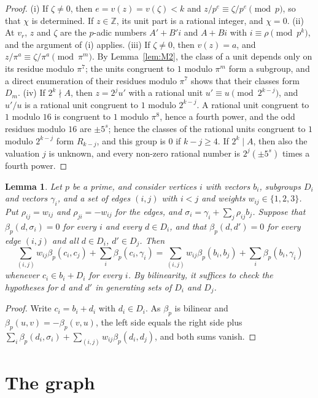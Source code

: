 \documentclass[11pt]{article}
\newtheorem{lemma}[theorem]{Lemma}
\newcommand{\Z}{\mathbb{Z}}
\begin{document}
\begin{proof}
(i) If $\zeta\neq0$, then $e=v(z)=v(\zeta)<k$ and $z/p^e\equiv\zeta/p^e\pmod p$, so that $\chi$ is determined. If $z\in\Z$, its unit part is a rational integer, and $\chi=0$. (ii) At $v_r$, $z$ and $\zeta$ are the $p$-adic numbers $A'+B'i$ and $A+Bi$ with $i\equiv\rho\pmod{p^k}$, and the argument of (i) applies. (iii) If $\zeta\neq0$, then $v(z)=a$, and $z/\pi^a\equiv\zeta/\pi^a\pmod{\pi^m}$. By Lemma~\ref{lem:M2}, the class of a unit depends only on its residue modulo $\pi^7$; the units congruent to $1$ modulo $\pi^m$ form a subgroup, and a direct enumeration of their residues modulo $\pi^7$ shows that their classes form $D_m$. (iv) If $2^k\nmid A$, then $z=2^ju'$ with a rational unit $u'\equiv u\pmod{2^{k-j}}$, and $u'/u$ is a rational unit congruent to $1$ modulo $2^{k-j}$. A rational unit congruent to $1$ modulo $16$ is congruent to $1$ modulo $\pi^8$, hence a fourth power, and the odd residues modulo $16$ are $\pm5^s$; hence the classes of the rational units congruent to $1$ modulo $2^{k-j}$ form $R_{k-j}$, and this group is $0$ if $k-j\geq4$. If $2^k\mid A$, then also the valuation $j$ is unknown, and every non-zero rational number is $2^j(\pm5^s)$ times a fourth power.
\end{proof}

\begin{lemma}\label{lem:envelope}
Let $p$ be a prime, and consider vertices $i$ with vectors $b_i$, subgroups $D_i$ and vectors $\gamma_i$, and a set of edges $(i,j)$ with $i<j$ and weights $w_{ij}\in\{1,2,3\}$. Put $\rho_{ij}=w_{ij}$ and $\rho_{ji}=-w_{ij}$ for the edges, and $\sigma_i=\gamma_i+\sum_j\rho_{ij}b_j$. Suppose that $\beta_p(d,\sigma_i)=0$ for every $i$ and every $d\in D_i$, and that $\beta_p(d,d')=0$ for every edge $(i,j)$ and all $d\in D_i$, $d'\in D_j$. Then
\[
\sum_{(i,j)}w_{ij}\beta_p(c_i,c_j)+\sum_i\beta_p(c_i,\gamma_i)=\sum_{(i,j)}w_{ij}\beta_p(b_i,b_j)+\sum_i\beta_p(b_i,\gamma_i)
\]
whenever $c_i\in b_i+D_i$ for every $i$. By bilinearity, it suffices to check the hypotheses for $d$ and $d'$ in generating sets of $D_i$ and $D_j$.
\end{lemma}

\begin{proof}
Write $c_i=b_i+d_i$ with $d_i\in D_i$. As $\beta_p$ is bilinear and $\beta_p(u,v)=-\beta_p(v,u)$, the left side equals the right side plus $\sum_i\beta_p(d_i,\sigma_i)+\sum_{(i,j)}w_{ij}\beta_p(d_i,d_j)$, and both sums vanish.
\end{proof}
\section{The graph}
\end{document}
